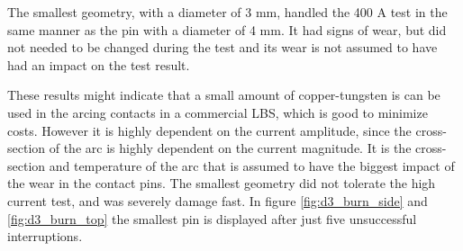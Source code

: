 \documentclass[10pt,a4paper]{article} %
\begin{document}
The smallest geometry, with a diameter of 3 mm, handled the 400 A test in the same manner as the pin with a diameter of 4 mm. It had signs of wear, but did not needed to be changed during the test and its wear is not assumed to have had an impact on the test result.

These results might indicate that a small amount of copper-tungsten is can be used in the arcing contacts in a commercial LBS, which is good to minimize costs. However it is highly dependent on the current amplitude, since the cross-section of the arc is highly dependent on the current magnitude. It is the cross-section and temperature of the arc that is assumed to have the biggest impact of the wear in the contact pins. The smallest geometry did not tolerate the high current test, and was severely damage fast. In figure \ref{fig:d3_burn_side} and \ref{fig:d3_burn_top} the smallest pin is displayed after just five unsuccessful interruptions. 
\end{document}
